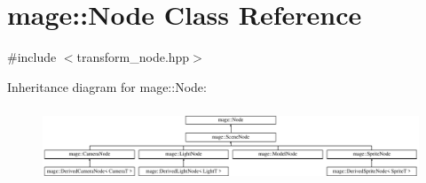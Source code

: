 \hypertarget{classmage_1_1_node}{}\section{mage\+:\+:Node Class Reference}
\label{classmage_1_1_node}


{\ttfamily \#include $<$transform\+\_\+node.\+hpp$>$}

Inheritance diagram for mage\+:\+:Node\+:\begin{figure}[H]
\begin{center}
\leavevmode
\includegraphics[height=2.240000cm]{classmage_1_1_node}
\end{center}
\end{figure}
